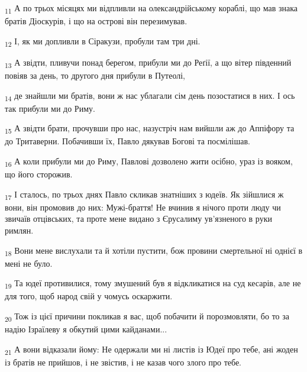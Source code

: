 \begin{tcolorbox}
\textsubscript{11} А по трьох місяцях ми відпливли на олександрійському кораблі, що мав знака братів Діоскурів, і що на острові він перезимував.
\end{tcolorbox}
\begin{tcolorbox}
\textsubscript{12} І, як ми допливли в Сіракузи, пробули там три дні.
\end{tcolorbox}
\begin{tcolorbox}
\textsubscript{13} А звідти, пливучи понад берегом, прибули ми до Реґії, а що вітер південний повіяв за день, то другого дня прибули в Путеолі,
\end{tcolorbox}
\begin{tcolorbox}
\textsubscript{14} де знайшли ми братів, вони ж нас ублагали сім день позостатися в них. І ось так прибули ми до Риму.
\end{tcolorbox}
\begin{tcolorbox}
\textsubscript{15} А звідти брати, прочувши про нас, назустріч нам вийшли аж до Аппіфору та до Тритаверни. Побачивши їх, Павло дякував Богові та посмілішав.
\end{tcolorbox}
\begin{tcolorbox}
\textsubscript{16} А коли прибули ми до Риму, Павлові дозволено жити осібно, ураз із вояком, що його сторожив.
\end{tcolorbox}
\begin{tcolorbox}
\textsubscript{17} І сталось, по трьох днях Павло скликав знатніших з юдеїв. Як зійшлися ж вони, він промовив до них: Мужі-браття! Не вчинив я нічого проти люду чи звичаїв отцівських, та проте мене видано з Єрусалиму ув'язненого в руки римлян.
\end{tcolorbox}
\begin{tcolorbox}
\textsubscript{18} Вони мене вислухали та й хотіли пустити, бож провини смертельної ні однієї в мені не було.
\end{tcolorbox}
\begin{tcolorbox}
\textsubscript{19} Та юдеї противилися, тому змушений був я відкликатися на суд кесарів, але не для того, щоб народ свій у чомусь оскаржити.
\end{tcolorbox}
\begin{tcolorbox}
\textsubscript{20} Тож із цієї причини покликав я вас, щоб побачити й порозмовляти, бо то за надію Ізраїлеву я обкутий цими кайданами...
\end{tcolorbox}
\begin{tcolorbox}
\textsubscript{21} А вони відказали йому: Не одержали ми ні листів із Юдеї про тебе, ані жоден із братів не прийшов, і не звістив, і не казав чого злого про тебе.
\end{tcolorbox}
